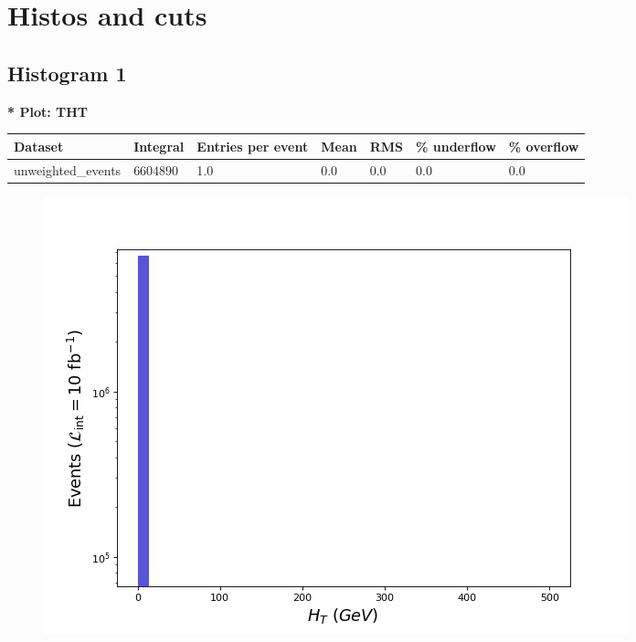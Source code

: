 \documentclass[a4paper, 10pt]{article}
\begin{document}
\newpage
\section{ Histos and cuts}

\subsection{ Histogram 1}

\textbf{* Plot: THT}\\
   \begin{table}[H]
  \begin{center}
    \begin{tabular}{|m{23.0mm}|m{23.0mm}|m{18.0mm}|m{19.0mm}|m{19.0mm}|m{19.0mm}|m{19.0mm}|}
      \hline
      {\cellcolor{yellow}         Dataset}& {\cellcolor{yellow}         Integral}& {\cellcolor{yellow}         Entries per event}& {\cellcolor{yellow}         Mean}& {\cellcolor{yellow}         RMS}& {\cellcolor{yellow}         \% underflow}& {\cellcolor{yellow}         \% overflow}\\
      \hline
      {\cellcolor{white}         unweighted\_events}& {\cellcolor{white}         6604890}& {\cellcolor{white}         1.0}& {\cellcolor{white}         0.0}& {\cellcolor{white}         0.0}& {\cellcolor{green}         0.0}& {\cellcolor{green}         0.0}\\
\hline
    \end{tabular}
  \end{center}
\end{table}

\begin{figure}[H]
  \begin{center}
    \includegraphics[scale=0.45]{selection_0.png}\\
\caption{   }
  \end{center}
\end{figure}
      \newpage
\end{document}
